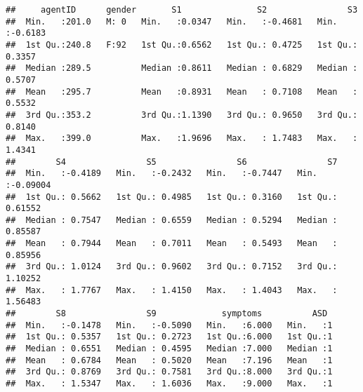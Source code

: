 \documentclass[]{article}
\newenvironment{Shaded}{\begin{snugshade}}{\end{snugshade}}
\newcommand{\KeywordTok}[1]{\textcolor[rgb]{0.13,0.29,0.53}{\textbf{#1}}}
\newcommand{\DecValTok}[1]{\textcolor[rgb]{0.00,0.00,0.81}{#1}}
\newcommand{\StringTok}[1]{\textcolor[rgb]{0.31,0.60,0.02}{#1}}
\newcommand{\CommentTok}[1]{\textcolor[rgb]{0.56,0.35,0.01}{\textit{#1}}}
\newcommand{\OperatorTok}[1]{\textcolor[rgb]{0.81,0.36,0.00}{\textbf{#1}}}
\newcommand{\NormalTok}[1]{#1}
\begin{document}
\begin{verbatim}
##     agentID      gender       S1               S2                S3         
##  Min.   :201.0   M: 0   Min.   :0.0347   Min.   :-0.4681   Min.   :-0.6183  
##  1st Qu.:240.8   F:92   1st Qu.:0.6562   1st Qu.: 0.4725   1st Qu.: 0.3357  
##  Median :289.5          Median :0.8611   Median : 0.6829   Median : 0.5707  
##  Mean   :295.7          Mean   :0.8931   Mean   : 0.7108   Mean   : 0.5532  
##  3rd Qu.:353.2          3rd Qu.:1.1390   3rd Qu.: 0.9650   3rd Qu.: 0.8140  
##  Max.   :399.0          Max.   :1.9696   Max.   : 1.7483   Max.   : 1.4341  
##        S4                S5                S6                S7          
##  Min.   :-0.4189   Min.   :-0.2432   Min.   :-0.7447   Min.   :-0.09004  
##  1st Qu.: 0.5662   1st Qu.: 0.4985   1st Qu.: 0.3160   1st Qu.: 0.61552  
##  Median : 0.7547   Median : 0.6559   Median : 0.5294   Median : 0.85587  
##  Mean   : 0.7944   Mean   : 0.7011   Mean   : 0.5493   Mean   : 0.85956  
##  3rd Qu.: 1.0124   3rd Qu.: 0.9602   3rd Qu.: 0.7152   3rd Qu.: 1.10252  
##  Max.   : 1.7767   Max.   : 1.4150   Max.   : 1.4043   Max.   : 1.56483  
##        S8                S9             symptoms          ASD   
##  Min.   :-0.1478   Min.   :-0.5090   Min.   :6.000   Min.   :1  
##  1st Qu.: 0.5357   1st Qu.: 0.2723   1st Qu.:6.000   1st Qu.:1  
##  Median : 0.6551   Median : 0.4595   Median :7.000   Median :1  
##  Mean   : 0.6784   Mean   : 0.5020   Mean   :7.196   Mean   :1  
##  3rd Qu.: 0.8769   3rd Qu.: 0.7581   3rd Qu.:8.000   3rd Qu.:1  
##  Max.   : 1.5347   Max.   : 1.6036   Max.   :9.000   Max.   :1
\end{verbatim}

\begin{Shaded}
\end{Shaded}
\end{document}
